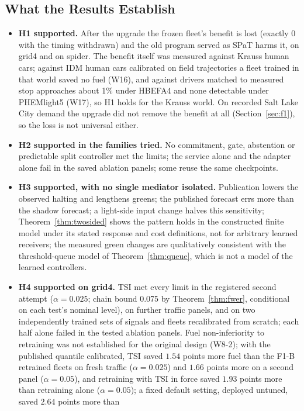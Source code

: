 \subsection{What the Results Establish}
\begin{itemize}\setlength\itemsep{1pt}
\item \textbf{H1 supported.} After the upgrade the frozen fleet's benefit is lost (exactly 0 with the timing withdrawn) and the old program
served as SPaT harms it, on grid4 and on spider. The benefit itself was measured against Krauss human cars; against IDM human cars
calibrated on field trajectories a fleet trained in that world saved no fuel (W16), and against drivers matched to measured stop approaches
about 1\% under HBEFA4 and none detectable under PHEMlight5 (W17), so H1 holds for the Krauss world. On recorded
Salt Lake City demand the upgrade did not remove the benefit at all (Section~\ref{sec:f1}), so the loss is not universal either.
\item \textbf{H2 supported in the families tried.} No commitment, gate, abstention or predictable split controller met the limits; the
service alone and the adapter alone fail in the saved ablation panels; some reuse the same checkpoints.
\item \textbf{H3 supported, with no single mediator isolated.} Publication lowers the observed halting and lengthens greens; the published
forecast errs more than the shadow forecast; a light-side input change halves this sensitivity; Theorem~\ref{thm:twosided} shows the
pattern holds in the constructed finite model under its stated response and cost definitions, not for arbitrary learned receivers; the measured green changes are qualitatively consistent with the threshold-queue model of
Theorem~\ref{thm:queue}, which is not a model of the learned controllers.
\item \textbf{H4 supported on grid4.} TSI met every limit in the registered second attempt ($\alpha=0.025$; chain bound 0.075 by
Theorem~\ref{thm:fwer}, conditional on each test's nominal level), on further traffic panels, and on two independently trained sets of
signals and fleets recalibrated from scratch; each half alone failed in the tested ablation panels. Fuel non-inferiority to retraining was
not established for the original design (W8-2); with the published quantile calibrated, TSI saved $1.54$ points more fuel than the F1-B
retrained fleets on fresh traffic ($\alpha=0.025$) and $1.66$ points more on a second panel ($\alpha=0.05$), and retraining with TSI in force
saved $1.93$ points more than retraining alone ($\alpha=0.05$); a fixed default setting, deployed untuned, saved $2.64$ points more than

\end{itemize}
